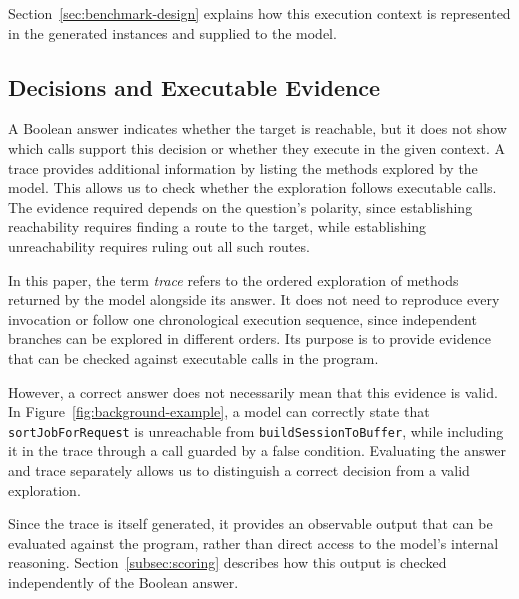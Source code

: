 Section~\ref{sec:benchmark-design} explains how this execution context is represented in the generated instances and supplied to the model.

\subsection{Decisions and Executable Evidence}

A Boolean answer indicates whether the target is reachable, but it does not show which calls support this decision or whether they execute in the given context. A trace provides additional information by listing the methods explored by the model. This allows us to check whether the exploration follows executable calls. The evidence required depends on the question's polarity, since establishing reachability requires finding a route to the target, while establishing unreachability requires ruling out all such routes.

In this paper, the term \emph{trace} refers to the ordered exploration of methods returned by the model alongside its answer. It does not need to reproduce every invocation or follow one chronological execution sequence, since independent branches can be explored in different orders. Its purpose is to provide evidence that can be checked against executable calls in the program.

However, a correct answer does not necessarily mean that this evidence is valid. In Figure~\ref{fig:background-example}, a model can correctly state that \texttt{sortJobForRequest} is unreachable from \texttt{buildSessionToBuffer}, while including it in the trace through a call guarded by a false condition. Evaluating the answer and trace separately allows us to distinguish a correct decision from a valid exploration.

Since the trace is itself generated, it provides an observable output that can be evaluated against the program, rather than direct access to the model's internal reasoning. Section~\ref{subsec:scoring} describes how this output is checked independently of the Boolean answer.
